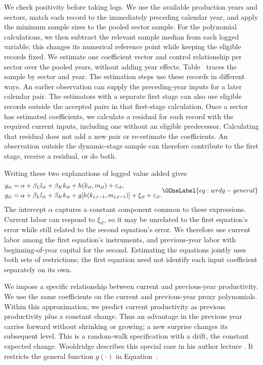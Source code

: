 We check positivity before taking logs. We use the available production years and sectors, match each record to the immediately preceding calendar year, and apply the minimum sample sizes to the pooled sector sample. For the polynomial calculations, we then subtract the relevant sample median from each logged variable; this changes its numerical reference point while keeping the eligible records fixed. We estimate one coefficient vector and control relationship per sector over the pooled years, without adding year effects. Table~ traces the sample by sector and year.
The estimation steps use these records in different ways. An earlier observation can supply the preceding-year inputs for a later calendar pair. The estimators with a separate first stage can also use eligible records outside the accepted pairs in that first-stage calculation. Once a sector has estimated coefficients, we calculate a residual for each record with the required current inputs, including one without an eligible predecessor. Calculating that residual does not add a new pair or re-estimate the coefficients. An observation outside the dynamic-stage sample can therefore contribute to the first stage, receive a residual, or do both.


Writing these two explanations of logged value added gives
\begin{equation}
\begin{aligned}
y_{it}&=\alpha+\beta_Ll_{it}+\beta_Kk_{it}+h(k_{it},m_{it})+\varepsilon_{it},\\
y_{it}&=\alpha+\beta_Ll_{it}+\beta_Kk_{it}+g\!\left[h(k_{i,t-1},m_{i,t-1})\right]+\xi_{it}+\varepsilon_{it}.
\end{aligned}
\GOneLabel{eq:wrdg-general}
\end{equation}
The intercept $\alpha$ captures a constant component common to these expressions. Current labor can respond to $\xi_{it}$, so it may be unrelated to the first equation's error while still related to the second equation's error. We therefore use current labor among the first equation's instruments, and previous-year labor with beginning-of-year capital for the second. Estimating the equations jointly uses both sets of restrictions; the first equation need not identify each input coefficient separately on its own.

We impose a specific relationship between current and previous-year productivity. We use the same coefficients on the current and previous-year proxy polynomials. Within this approximation, we predict current productivity as previous productivity plus a constant change. Thus an advantage in the previous year carries forward without shrinking or growing; a new surprise changes its subsequent level. This is a random-walk specification with a drift, the constant expected change. Wooldridge describes this special case in his author lecture \citep[pp.~21--22]{wooldridgelecture}. It restricts the general function $g(\cdot)$ in Equation~.

